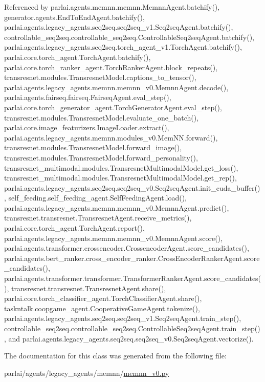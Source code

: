 Referenced by parlai.\+agents.\+memnn.\+memnn.\+Memnn\+Agent.\+batchify(), generator.\+agents.\+End\+To\+End\+Agent.\+batchify(), parlai.\+agents.\+legacy\+\_\+agents.\+seq2seq.\+seq2seq\+\_\+v1.\+Seq2seq\+Agent.\+batchify(), controllable\+\_\+seq2seq.\+controllable\+\_\+seq2seq.\+Controllable\+Seq2seq\+Agent.\+batchify(), parlai.\+agents.\+legacy\+\_\+agents.\+seq2seq.\+torch\+\_\+agent\+\_\+v1.\+Torch\+Agent.\+batchify(), parlai.\+core.\+torch\+\_\+agent.\+Torch\+Agent.\+batchify(), parlai.\+core.\+torch\+\_\+ranker\+\_\+agent.\+Torch\+Ranker\+Agent.\+block\+\_\+repeats(), transresnet.\+modules.\+Transresnet\+Model.\+captions\+\_\+to\+\_\+tensor(), parlai.\+agents.\+legacy\+\_\+agents.\+memnn.\+memnn\+\_\+v0.\+Memnn\+Agent.\+decode(), parlai.\+agents.\+fairseq.\+fairseq.\+Fairseq\+Agent.\+eval\+\_\+step(), parlai.\+core.\+torch\+\_\+generator\+\_\+agent.\+Torch\+Generator\+Agent.\+eval\+\_\+step(), transresnet.\+modules.\+Transresnet\+Model.\+evaluate\+\_\+one\+\_\+batch(), parlai.\+core.\+image\+\_\+featurizers.\+Image\+Loader.\+extract(), parlai.\+agents.\+legacy\+\_\+agents.\+memnn.\+modules\+\_\+v0.\+Mem\+N\+N.\+forward(), transresnet.\+modules.\+Transresnet\+Model.\+forward\+\_\+image(), transresnet.\+modules.\+Transresnet\+Model.\+forward\+\_\+personality(), transresnet\+\_\+multimodal.\+modules.\+Transresnet\+Multimodal\+Model.\+get\+\_\+loss(), transresnet\+\_\+multimodal.\+modules.\+Transresnet\+Multimodal\+Model.\+get\+\_\+rep(), parlai.\+agents.\+legacy\+\_\+agents.\+seq2seq.\+seq2seq\+\_\+v0.\+Seq2seq\+Agent.\+init\+\_\+cuda\+\_\+buffer(), self\+\_\+feeding.\+self\+\_\+feeding\+\_\+agent.\+Self\+Feeding\+Agent.\+load(), parlai.\+agents.\+legacy\+\_\+agents.\+memnn.\+memnn\+\_\+v0.\+Memnn\+Agent.\+predict(), transresnet.\+transresnet.\+Transresnet\+Agent.\+receive\+\_\+metrics(), parlai.\+core.\+torch\+\_\+agent.\+Torch\+Agent.\+report(), parlai.\+agents.\+legacy\+\_\+agents.\+memnn.\+memnn\+\_\+v0.\+Memnn\+Agent.\+score(), parlai.\+agents.\+transformer.\+crossencoder.\+Crossencoder\+Agent.\+score\+\_\+candidates(), parlai.\+agents.\+bert\+\_\+ranker.\+cross\+\_\+encoder\+\_\+ranker.\+Cross\+Encoder\+Ranker\+Agent.\+score\+\_\+candidates(), parlai.\+agents.\+transformer.\+transformer.\+Transformer\+Ranker\+Agent.\+score\+\_\+candidates(), transresnet.\+transresnet.\+Transresnet\+Agent.\+share(), parlai.\+core.\+torch\+\_\+classifier\+\_\+agent.\+Torch\+Classifier\+Agent.\+share(), taskntalk.\+coopgame\+\_\+agent.\+Cooperative\+Game\+Agent.\+tokenize(), parlai.\+agents.\+legacy\+\_\+agents.\+seq2seq.\+seq2seq\+\_\+v1.\+Seq2seq\+Agent.\+train\+\_\+step(), controllable\+\_\+seq2seq.\+controllable\+\_\+seq2seq.\+Controllable\+Seq2seq\+Agent.\+train\+\_\+step(), and parlai.\+agents.\+legacy\+\_\+agents.\+seq2seq.\+seq2seq\+\_\+v0.\+Seq2seq\+Agent.\+vectorize().



The documentation for this class was generated from the following file\+:\begin{DoxyCompactItemize}
\item 
parlai/agents/legacy\+\_\+agents/memnn/\hyperlink{memnn__v0_8py}{memnn\+\_\+v0.\+py}\end{DoxyCompactItemize}
